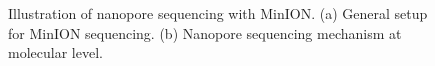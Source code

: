 \begin{figure}[h]
\centering
{}
\hfill
{}
\caption[Illustration of nanopore sequencing with MinION]{Illustration of nanopore sequencing with MinION. (a) General setup for MinION sequencing. (b) Nanopore sequencing mechanism at molecular level.}
\label{F:nnp_run}
\end{figure}

